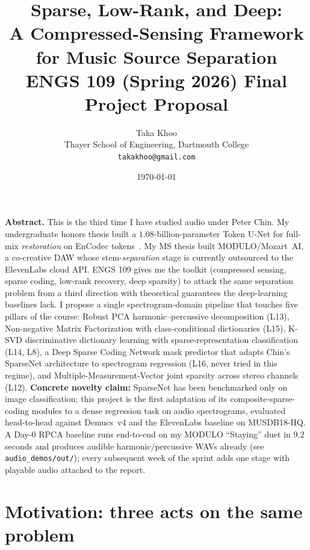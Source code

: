 \documentclass[11pt]{article}
\title{\vspace{-2.0em}\textbf{Sparse, Low-Rank, and Deep:\\
A Compressed-Sensing Framework for Music Source Separation}\\[0.4em]
\large ENGS 109 (Spring 2026) Final Project Proposal}
\author{Taka Khoo \\ \small Thayer School of Engineering, Dartmouth College \\
\small \texttt{takakhoo@gmail.com}}
\date{\vspace{-1em}\today}
\begin{document}
\maketitle
\vspace{-2em}

\begin{tcolorbox}
\textbf{Abstract.}\;
This is the third time I have studied audio under Peter Chin.  My
undergraduate honors thesis built a $1.08$-billion-parameter Token
U-Net for full-mix \emph{restoration} on EnCodec
tokens~\cite{khoo2025tokenunet}.  My MS thesis built MODULO/Mozart~AI,
a co-creative DAW whose stem-\emph{separation} stage is currently
outsourced to the ElevenLabs cloud API.  ENGS 109 gives me the
toolkit (compressed sensing, sparse coding, low-rank recovery,
deep sparsity) to attack the same separation problem from a third
direction with theoretical guarantees the deep-learning baselines
lack.  I propose a single spectrogram-domain pipeline that touches
five pillars of the course: Robust PCA harmonic--percussive
decomposition (L13), Non-negative Matrix Factorization with
class-conditional dictionaries (L15), K-SVD discriminative dictionary
learning with sparse-representation classification (L14, L8), a Deep
Sparse Coding Network mask predictor that adapts Chin's SparseNet
architecture to spectrogram regression (L16, never tried in this
regime), and Multiple-Measurement-Vector joint sparsity across stereo
channels (L12).  \textbf{Concrete novelty claim:} SparseNet has been
benchmarked only on image classification; this project is the first
adaptation of its composite-sparse-coding modules to a dense
regression task on audio spectrograms, evaluated head-to-head against
Demucs~v4 and the ElevenLabs baseline on MUSDB18-HQ.  A Day-0 RPCA
baseline runs end-to-end on my MODULO ``Staying'' duet in $9.2$
seconds and produces audible harmonic/percussive WAVs already (see
\texttt{audio\_demos/out/}); every subsequent week of the sprint adds
one stage with playable audio attached to the report.
\end{tcolorbox}

\section{Motivation: three acts on the same problem}
\end{document}
